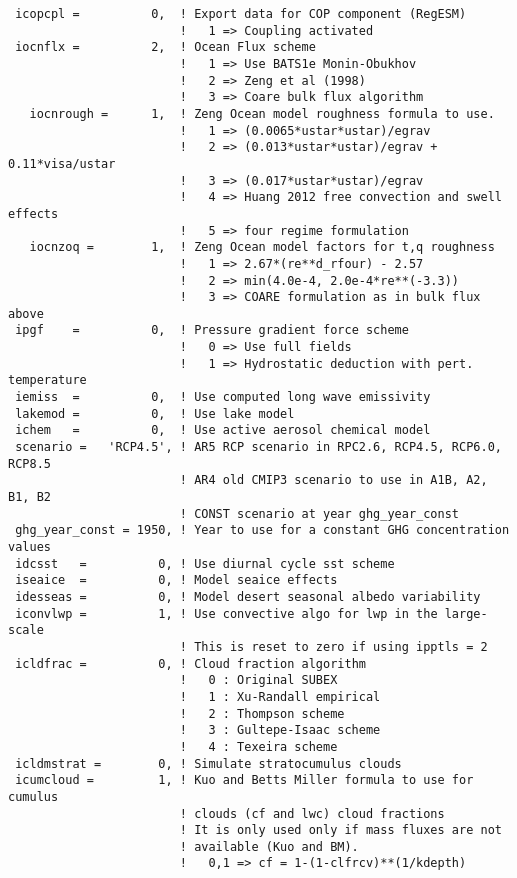 {\begin{Verbatim}
 icopcpl =          0,  ! Export data for COP component (RegESM)
                        !   1 => Coupling activated
 iocnflx =          2,  ! Ocean Flux scheme
                        !   1 => Use BATS1e Monin-Obukhov
                        !   2 => Zeng et al (1998)
                        !   3 => Coare bulk flux algorithm
   iocnrough =      1,  ! Zeng Ocean model roughness formula to use.
                        !   1 => (0.0065*ustar*ustar)/egrav
                        !   2 => (0.013*ustar*ustar)/egrav + 0.11*visa/ustar
                        !   3 => (0.017*ustar*ustar)/egrav
                        !   4 => Huang 2012 free convection and swell effects
                        !   5 => four regime formulation
   iocnzoq =        1,  ! Zeng Ocean model factors for t,q roughness
                        !   1 => 2.67*(re**d_rfour) - 2.57
                        !   2 => min(4.0e-4, 2.0e-4*re**(-3.3))
                        !   3 => COARE formulation as in bulk flux above
 ipgf    =          0,  ! Pressure gradient force scheme
                        !   0 => Use full fields
                        !   1 => Hydrostatic deduction with pert. temperature
 iemiss  =          0,  ! Use computed long wave emissivity
 lakemod =          0,  ! Use lake model
 ichem   =          0,  ! Use active aerosol chemical model
 scenario =   'RCP4.5', ! AR5 RCP scenario in RPC2.6, RCP4.5, RCP6.0, RCP8.5
                        ! AR4 old CMIP3 scenario to use in A1B, A2, B1, B2
                        ! CONST scenario at year ghg_year_const
 ghg_year_const = 1950, ! Year to use for a constant GHG concentration values
 idcsst   =          0, ! Use diurnal cycle sst scheme
 iseaice  =          0, ! Model seaice effects
 idesseas =          0, ! Model desert seasonal albedo variability
 iconvlwp =          1, ! Use convective algo for lwp in the large-scale
                        ! This is reset to zero if using ipptls = 2
 icldfrac =          0, ! Cloud fraction algorithm
                        !   0 : Original SUBEX
                        !   1 : Xu-Randall empirical
                        !   2 : Thompson scheme
                        !   3 : Gultepe-Isaac scheme
                        !   4 : Texeira scheme
 icldmstrat =        0, ! Simulate stratocumulus clouds
 icumcloud =         1, ! Kuo and Betts Miller formula to use for cumulus
                        ! clouds (cf and lwc) cloud fractions
                        ! It is only used only if mass fluxes are not
                        ! available (Kuo and BM).
                        !   0,1 => cf = 1-(1-clfrcv)**(1/kdepth)

\end{Verbatim}}
